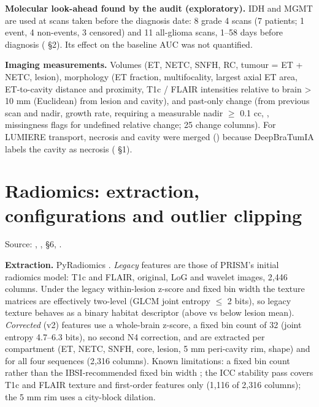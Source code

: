 \documentclass[11pt,a4paper]{article}
\begin{document}
\textbf{Molecular look-ahead found by the audit (exploratory).} IDH and MGMT are used at scans taken before
the diagnosis date: 8 grade 4 scans (7 patients; 1 event, 4 non-events, 3 censored) and 11 all-glioma scans,
1--58 days before diagnosis ( \S{}2). Its effect on the baseline AUC was not
quantified.

\textbf{Imaging measurements.} Volumes (ET, NETC, SNFH, RC, tumour = ET + NETC, lesion), morphology (ET
fraction, multifocality, largest axial ET area, ET-to-cavity distance and proximity, T1c / FLAIR intensities
relative to brain > 10 mm (Euclidean) from lesion and cavity), and past-only change (from previous scan and
nadir, growth rate,  requiring a measurable nadir $\geq$ 0.1 cc,
, missingness flags for
undefined relative change; 25 change columns). For
LUMIERE transport, necrosis and cavity were merged
() because DeepBraTumIA
labels the cavity as necrosis ( \S{}1).

\FloatBarrier
\section{Radiomics: extraction, configurations and outlier clipping}\label{sec:S5}

Source: ,
,
 \S{}6,
.

\textbf{Extraction.} PyRadiomics \citep{vangriethuysen2017}. \emph{Legacy} features are those of PRISM's
initial radiomics model: T1c and FLAIR, original, LoG and wavelet images, 2,446 columns. Under the legacy within-lesion z-score
and fixed bin width the texture matrices are effectively two-level (GLCM joint entropy $\leq$ 2 bits), so
legacy texture behaves as a binary habitat descriptor (above vs below lesion mean). \emph{Corrected} (v2)
features use a whole-brain z-score, a fixed bin count of 32 (joint entropy 4.7--6.3 bits), no second N4
correction, and are extracted per compartment (ET, NETC, SNFH, core, lesion, 5 mm peri-cavity rim, shape) and
for all four sequences (2,316 columns). Known limitations: a fixed bin count rather than the IBSI-recommended
fixed bin width \citep{zwanenburg2020}; the ICC stability pass covers T1c and FLAIR texture and first-order
features only (1,116 of 2,316 columns); the 5 mm rim uses a city-block dilation.
\end{document}
